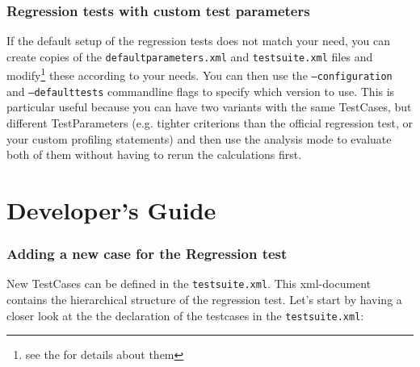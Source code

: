 \documentclass[a4paper,12pt]{scrartcl}
\begin{document}
\section{Regression tests with custom test parameters}
If the default setup of the regression tests does not match your need, you can create copies of the
\texttt{defaultparameters.xml} and \texttt{testsuite.xml} files and modify\footnote{see the  for
details about them} these according to your needs. You can then use the \texttt{--configuration} and
\texttt{--defaulttests} commandline flags to specify which version to use. This is particular useful because you can
have two variants with the same TestCases, but different TestParameters (e.g. tighter criterions than the official
regression test, or your custom profiling statements) and then use the analysis mode to evaluate both of them
without having to rerun the calculations first.

\newpage
\part{Developer's Guide}\label{devguide}

\section{Adding a new case for the Regression test}
New TestCases can be defined in the \texttt{testsuite.xml}. This xml-document contains the hierarchical structure of
the regression test. Let's start by having a closer look at the the declaration of the testcases in the
\texttt{testsuite.xml}:
\end{document}
